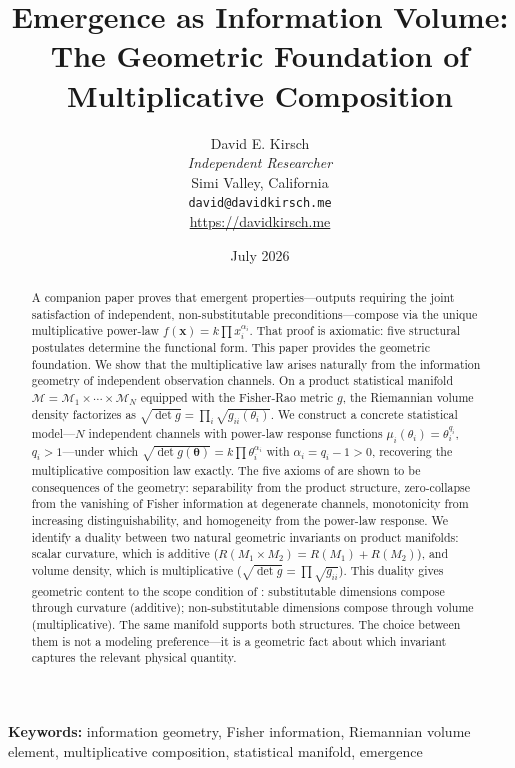\documentclass[12pt, a4paper]{article}
\title{\textbf{Emergence as Information Volume:\\The Geometric Foundation of Multiplicative Composition}}
\author{David E. Kirsch\\\textit{Independent Researcher}\\Simi Valley, California\\\texttt{david@davidkirsch.me}\\\url{https://davidkirsch.me}}
\date{July 2026}
\theoremstyle{definition}
\theoremstyle{remark}
\begin{document}
\maketitle

\begin{abstract}
A companion paper \cite{kirsch2026mc} proves that emergent properties---outputs requiring the joint satisfaction of independent, non-substitutable preconditions---compose via the unique multiplicative power-law $f(\mathbf{x}) = k \prod x_i^{\alpha_i}$. That proof is axiomatic: five structural postulates determine the functional form. This paper provides the geometric foundation. We show that the multiplicative law arises naturally from the information geometry of independent observation channels. On a product statistical manifold $\mathcal{M} = \mathcal{M}_1 \times \cdots \times \mathcal{M}_N$ equipped with the Fisher-Rao metric $g$, the Riemannian volume density factorizes as $\sqrt{\det g} = \prod_i \sqrt{g_{ii}(\theta_i)}$. We construct a concrete statistical model---$N$ independent channels with power-law response functions $\mu_i(\theta_i) = \theta_i^{q_i}$, $q_i > 1$---under which $\sqrt{\det g(\boldsymbol{\theta})} = k \prod \theta_i^{\alpha_i}$ with $\alpha_i = q_i - 1 > 0$, recovering the multiplicative composition law exactly. The five axioms of \cite{kirsch2026mc} are shown to be consequences of the geometry: separability from the product structure, zero-collapse from the vanishing of Fisher information at degenerate channels, monotonicity from increasing distinguishability, and homogeneity from the power-law response. We identify a duality between two natural geometric invariants on product manifolds: scalar curvature, which is additive ($R(M_1 \times M_2) = R(M_1) + R(M_2)$), and volume density, which is multiplicative ($\sqrt{\det g} = \prod \sqrt{g_{ii}}$). This duality gives geometric content to the scope condition of \cite{kirsch2026mc}: substitutable dimensions compose through curvature (additive); non-substitutable dimensions compose through volume (multiplicative). The same manifold supports both structures. The choice between them is not a modeling preference---it is a geometric fact about which invariant captures the relevant physical quantity.
\end{abstract}

\noindent\textbf{Keywords:} information geometry, Fisher information, Riemannian volume element, multiplicative composition, statistical manifold, emergence
\end{document}
